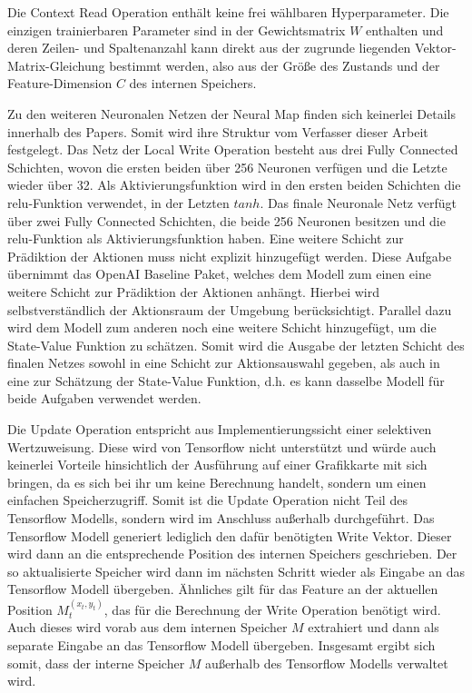 Die Context Read Operation enthält keine frei wählbaren Hyperparameter. Die einzigen trainierbaren Parameter sind in der Gewichtsmatrix $W$ enthalten und deren Zeilen- und Spaltenanzahl kann direkt aus der zugrunde liegenden Vektor-Matrix-Gleichung bestimmt werden, also aus der Größe des Zustands und der Feature-Dimension $C$ des internen Speichers.

Zu den weiteren Neuronalen Netzen der Neural Map finden sich keinerlei Details innerhalb des Papers. Somit wird ihre Struktur vom Verfasser dieser Arbeit festgelegt. Das Netz der Local Write Operation besteht aus drei Fully Connected Schichten, wovon die ersten beiden über 256 Neuronen verfügen und die Letzte wieder über 32. Als Aktivierungsfunktion wird in den ersten beiden Schichten die relu-Funktion verwendet, in der Letzten $tanh$. Das finale Neuronale Netz verfügt über zwei Fully Connected Schichten, die beide 256 Neuronen besitzen und die relu-Funktion als Aktivierungsfunktion haben. Eine weitere Schicht zur Prädiktion der Aktionen muss nicht explizit hinzugefügt werden. Diese Aufgabe übernimmt das OpenAI Baseline Paket, welches dem Modell zum einen eine weitere Schicht zur Prädiktion der Aktionen anhängt. Hierbei wird selbstverständlich der Aktionsraum der Umgebung berücksichtigt. Parallel dazu wird dem Modell zum anderen noch eine weitere Schicht hinzugefügt, um die State-Value Funktion zu schätzen. Somit wird die Ausgabe der letzten Schicht des finalen Netzes sowohl in eine Schicht zur Aktionsauswahl gegeben, als auch in eine zur Schätzung der State-Value Funktion, d.h. es kann dasselbe Modell für beide Aufgaben verwendet werden.

Die Update Operation entspricht aus Implementierungssicht einer selektiven Wertzuweisung. Diese wird von Tensorflow nicht unterstützt und würde auch keinerlei Vorteile hinsichtlich der Ausführung auf einer Grafikkarte mit sich bringen, da es sich bei ihr um keine Berechnung handelt, sondern um einen einfachen Speicherzugriff. Somit ist die Update Operation nicht Teil des Tensorflow Modells, sondern wird im Anschluss außerhalb durchgeführt. Das Tensorflow Modell generiert lediglich den dafür benötigten Write Vektor. Dieser wird dann an die entsprechende Position des internen Speichers geschrieben. Der so aktualisierte Speicher wird dann im nächsten Schritt wieder als Eingabe an das Tensorflow Modell übergeben. Ähnliches gilt für das Feature an der aktuellen Position $M_t^{(x_t,y_t)}$, das für die Berechnung der Write Operation benötigt wird. Auch dieses wird vorab aus dem internen Speicher $M$ extrahiert und dann als separate Eingabe an das Tensorflow Modell übergeben. Insgesamt ergibt sich somit, dass der interne Speicher $M$ außerhalb des Tensorflow Modells verwaltet wird.

